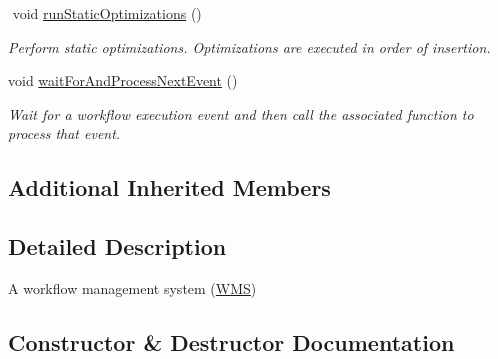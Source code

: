 \begin{DoxyCompactItemize}
$$\mbox{\label{classwrench_1_1_w_m_s_a6ce8628812f5bd8c813c92ad51265f6d}} 
void \hyperlink{classwrench_1_1_w_m_s_a6ce8628812f5bd8c813c92ad51265f6d}{run\+Static\+Optimizations} ()
\begin{DoxyCompactList}\small\item\em Perform static optimizations. Optimizations are executed in order of insertion. \end{DoxyCompactList}\item 
void \hyperlink{classwrench_1_1_w_m_s_a2923b4ec6f7e233693199154d5206d5f}{wait\+For\+And\+Process\+Next\+Event} ()
\begin{DoxyCompactList}\small\item\em Wait for a workflow execution event and then call the associated function to process that event. \end{DoxyCompactList}\end{DoxyCompactItemize}
\subsection*{Additional Inherited Members}


\subsection{Detailed Description}
A workflow management system (\hyperlink{classwrench_1_1_w_m_s}{W\+MS}) 

\subsection{Constructor \& Destructor Documentation}
\mbox{\label{classwrench_1_1_w_m_s_a385a87e02d2e6bd7e70624532bca3bdc}} 
